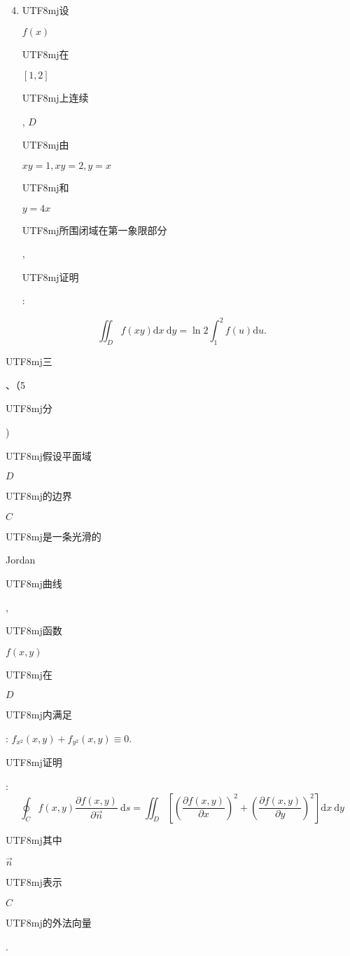 \documentclass[10pt]{article}
\begin{document}
\begin{enumerate}
  \setcounter{enumi}{3}
  \item \begin{CJK}{UTF8}{mj}设\end{CJK} $f(x)$ \begin{CJK}{UTF8}{mj}在\end{CJK} $[1,2]$ \begin{CJK}{UTF8}{mj}上连续\end{CJK}, $D$ \begin{CJK}{UTF8}{mj}由\end{CJK} $x y=1, x y=2, y=x$ \begin{CJK}{UTF8}{mj}和\end{CJK} $y=4 x$ \begin{CJK}{UTF8}{mj}所围闭域在第一象限部分\end{CJK}, \begin{CJK}{UTF8}{mj}证明\end{CJK}:
\end{enumerate}
$$
\iint_{D} f(x y) \mathrm{d} x \mathrm{~d} y=\ln 2 \int_{1}^{2} f(u) \mathrm{d} u .
$$
\begin{CJK}{UTF8}{mj}三\end{CJK}、（5 \begin{CJK}{UTF8}{mj}分\end{CJK}) \begin{CJK}{UTF8}{mj}假设平面域\end{CJK} $D$ \begin{CJK}{UTF8}{mj}的边界\end{CJK} $C$ \begin{CJK}{UTF8}{mj}是一条光滑的\end{CJK} Jordan \begin{CJK}{UTF8}{mj}曲线\end{CJK}, \begin{CJK}{UTF8}{mj}函数\end{CJK} $f(x, y)$ \begin{CJK}{UTF8}{mj}在\end{CJK} $D$ \begin{CJK}{UTF8}{mj}内满足\end{CJK}: $f_{x^{2}}(x, y)+f_{y^{2}}(x, y) \equiv 0$. \begin{CJK}{UTF8}{mj}证明\end{CJK}:
$$
\oint_{C} f(x, y) \frac{\partial f(x, y)}{\partial \vec{n}} \mathrm{~d} s=\iint_{D}\left[\left(\frac{\partial f(x, y)}{\partial x}\right)^{2}+\left(\frac{\partial f(x, y)}{\partial y}\right)^{2}\right] \mathrm{d} x \mathrm{~d} y
$$
\begin{CJK}{UTF8}{mj}其中\end{CJK} $\vec{n}$ \begin{CJK}{UTF8}{mj}表示\end{CJK} $C$ \begin{CJK}{UTF8}{mj}的外法向量\end{CJK}.
\end{document}
